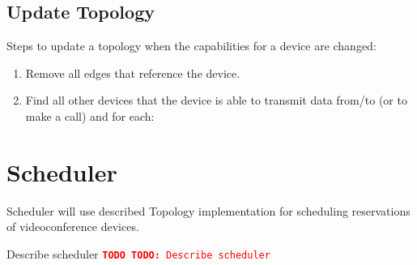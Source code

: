 \documentclass[a4paper]{report}
\newcommand{\TODO}[1]{%
\def\empty{}%
\def\prvniparametr{#1}%
\ifx\prvniparametr\empty%
\begingroup\tt\textcolor{red}{\noindent\textbf{TODO}}\endgroup
\else%
\begingroup\tt\textcolor{red}{\noindent\textbf{TODO:}\ #1}\endgroup
\fi%
}
\begin{document}
\section{Update Topology}     

Steps to update a topology when the capabilities for a device are changed:
\begin{enumerate}

\item Remove all edges that reference the device.

\item Find all other devices that the device is able to transmit data from/to
   (or to make a call) and for each:

\end{enumerate}  


\chapter{Scheduler}

Scheduler will use described Topology implementation for scheduling reservations of videoconference devices.

\TODO{Describe scheduler}
\end{document}
